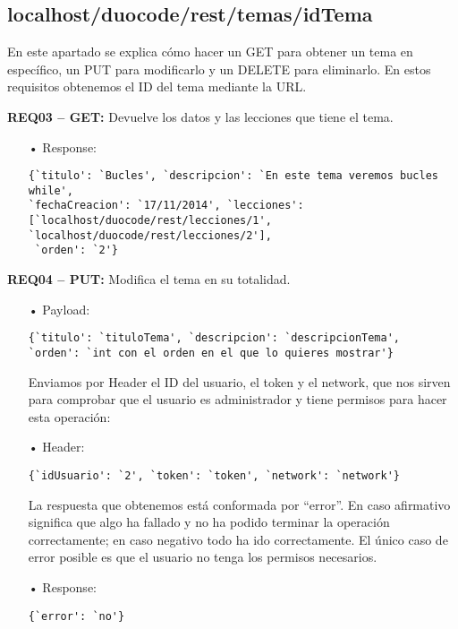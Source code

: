 \subsection{localhost/duocode/rest/temas/idTema}
En este apartado se explica cómo hacer un GET para obtener un tema en específico, un PUT para modificarlo y un DELETE para eliminarlo.
En estos requisitos obtenemos el ID del tema mediante la URL.
\vspace{1em}

\textbf{REQ03 – GET:} Devuelve los datos y las lecciones que tiene el tema.

\begin{itemize}
\item[•]Response:
{\codesize
\begin{verbatim}
{`titulo': `Bucles', `descripcion': `En este tema veremos bucles while', 
`fechaCreacion': `17/11/2014', `lecciones': 
[`localhost/duocode/rest/lecciones/1', `localhost/duocode/rest/lecciones/2'],
 `orden': `2'}
\end{verbatim}
}
\end{itemize}

\textbf{REQ04 – PUT:} Modifica el tema en su totalidad.
\begin{itemize}
\item[•]Payload:
{\codesize
\begin{verbatim}
{`titulo': `tituloTema', `descripcion': `descripcionTema', 
`orden': `int con el orden en el que lo quieres mostrar'}
\end{verbatim}
}

Enviamos por Header el ID del usuario, el token y el network, que nos sirven para comprobar que el usuario es administrador y tiene permisos para hacer esta operación:

\item[•]Header: 
{\codesize
\begin{verbatim}
{`idUsuario': `2', `token': `token', `network': `network'}
\end{verbatim}
}

La respuesta que obtenemos está conformada por ``error''. En caso afirmativo significa que algo ha fallado y no ha podido terminar la operación correctamente; en caso negativo todo ha ido correctamente. El único caso de error posible es que el usuario no tenga los permisos necesarios.

\item[•]Response: 
{\codesize
\begin{verbatim}
{`error': `no'}
\end{verbatim}
}
\end{itemize}

